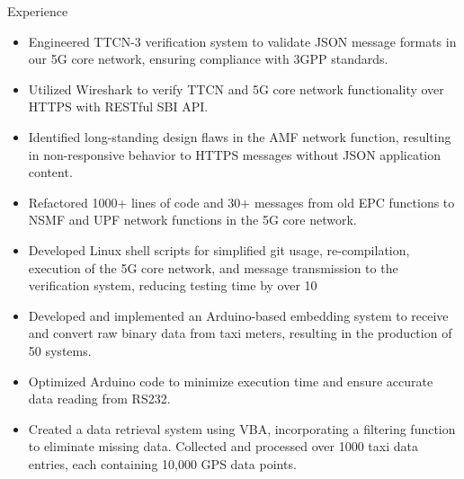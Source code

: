 \documentclass{resume} %
\begin{document}
\begin{workSection}{Experience}
    \experienceItem[
        company=Free5gc Team of NCTU,
        location=Hsinchu{,} Taiwan,
        position=Backend Engineer (Research Assistant),
        duration=Jul 2019 – Nov 2019
    ]
    \begin{itemize}
        \itemsep -6pt {} 
        \item Engineered TTCN-3 verification system to validate JSON message formats in our 5G core network, ensuring compliance with 3GPP standards.
        \item Utilized Wireshark to verify TTCN and 5G core network functionality over HTTPS with RESTful SBI API.
        \item Identified long-standing design flaws in the AMF network function, resulting in non-responsive behavior to HTTPS messages without JSON application content.
        \item Refactored 1000+ lines of code and 30+ messages from old EPC functions to NSMF and UPF network functions in the 5G core network.
        \item Developed Linux shell scripts for simplified git usage, re-compilation, execution of the 5G core network, and message transmission to the verification system, reducing testing time by over 10%
     \end{itemize}

    \experienceItem[
        company=MOTC TW \& NCTU,
        location=Taipei{,} Taiwan,
        position=Embedded System engineer (Research Assistant),
        duration=May 2018 – Aug 2018
    ]
    \begin{itemize}
        \itemsep -6pt {} 
        \item Developed and implemented an Arduino-based embedding system to receive and convert raw binary data from taxi meters, resulting in the production of 50 systems.
        \item Optimized Arduino code to minimize execution time and ensure accurate data reading from RS232.
        \item Created a data retrieval system using VBA, incorporating a filtering function to eliminate missing data. Collected and processed over 1000 taxi data entries, each containing 10,000 GPS data points.
     \end{itemize}
     
\end{workSection}
\end{document}
